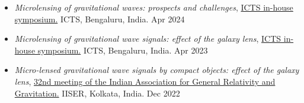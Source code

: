 \begin{itemize}
    \item \textit{Microlensing of gravitational waves: prospects and challenges}, \href{https://www.icts.res.in/inhouse2024}{ICTS in-house symposium.} ICTS, Bengaluru, India. \hfill{Apr 2024}

    \item \textit{Microlensing of gravitational wave signals: effect of the galaxy lens}, \href{https://www.icts.res.in/inhouse2023}{ICTS in-house symposium.} ICTS, Bengaluru, India. \hspace{2.65in} {Apr 2023}

    \item \textit{Micro-lensed gravitational wave signals by compact objects: effect of the galaxy lens}, \href{https://www.iiserkol.ac.in/~iagrg32/}{32nd meeting of the Indian Association for General Relativity and Gravitation.} IISER, Kolkata, India. \hfill{Dec 2022}
    
\end{itemize}